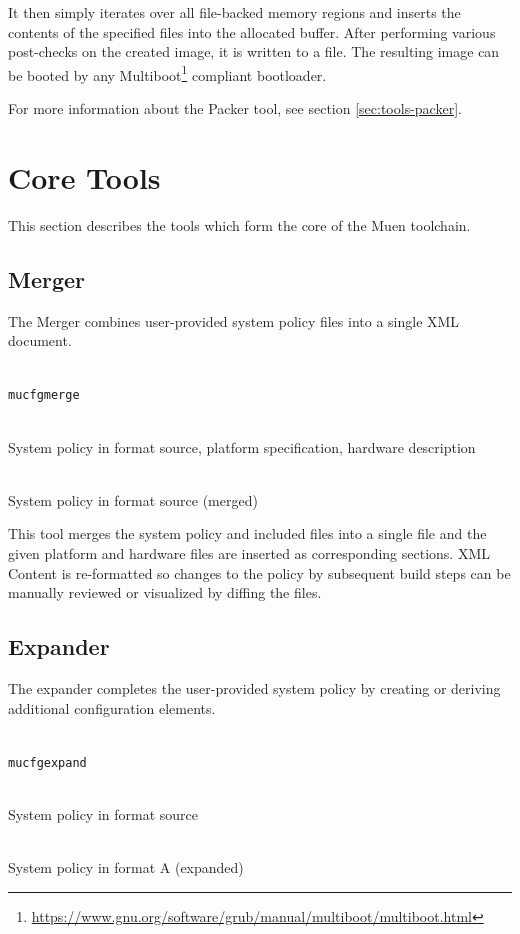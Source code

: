 \documentclass[a4paper,twoside,titlepage]{article}
\begin{document}
It then simply iterates over all file-backed memory regions and inserts the
contents of the specified files into the allocated buffer. After performing
various post-checks on the created image, it is written to a file. The
resulting image can be booted by any
Multiboot\footnote{\url{https://www.gnu.org/software/grub/manual/multiboot/multiboot.html}}
compliant bootloader.

For more information about the Packer tool, see section \ref{sec:tools-packer}.

\section{Core Tools}
\label{sec:tools}

This section describes the tools which form the core of the Muen toolchain.

\subsection{Merger}
\label{sec:tools-merger}
The Merger combines user-provided system policy files into a single XML
document.

\begin{description} \itemsep1pt \parskip0pt
	\item[Name] \hfill \\
		\texttt{mucfgmerge}
	\item[Input] \hfill \\
		System policy in format source, platform specification, hardware description
	\item[Output] \hfill \\
		System policy in format source (merged)
\end{description}

This tool merges the system policy and included files into a single file and the
given platform and hardware files are inserted as corresponding sections. XML
Content is re-formatted so changes to the policy by subsequent build steps can
be manually reviewed or visualized by diffing the files.

\subsection{Expander}
\label{sec:tools-expander}
The expander completes the user-provided system policy by creating or deriving
additional configuration elements.

\begin{description} \itemsep1pt \parskip0pt
	\item[Name] \hfill \\
		\texttt{mucfgexpand}
	\item[Input] \hfill \\
		System policy in format source
	\item[Output] \hfill \\
		System policy in format A (expanded)
\end{description}
\end{document}
